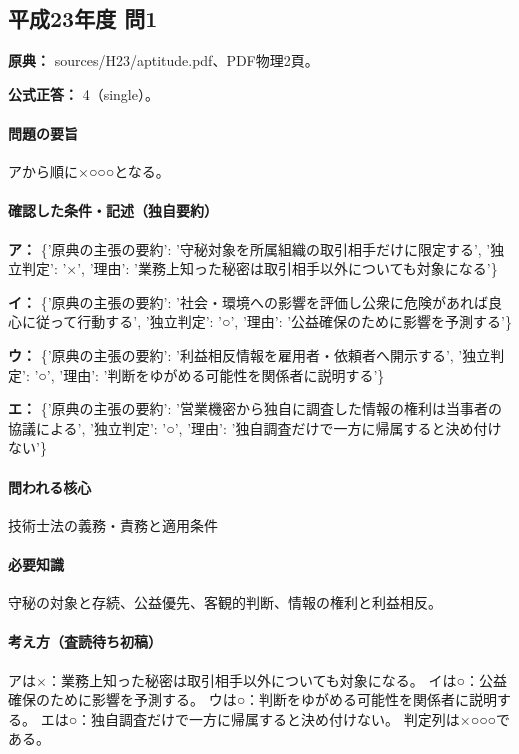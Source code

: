 \subsection{平成23年度 問1}
\label{q:h23-reg-apt-01}

\noindent\textbf{原典：} sources/H23/aptitude.pdf、PDF物理2頁。

\textbf{公式正答：} 4（single）。

\paragraph{問題の要旨} アから順に×○○○となる。

\paragraph{確認した条件・記述（独自要約）}\mbox{}\par

\noindent\textbf{ア：} \{'原典の主張の要約': '守秘対象を所属組織の取引相手だけに限定する', '独立判定': '×', '理由': '業務上知った秘密は取引相手以外についても対象になる'\}\par

\noindent\textbf{イ：} \{'原典の主張の要約': '社会・環境への影響を評価し公衆に危険があれば良心に従って行動する', '独立判定': '○', '理由': '公益確保のために影響を予測する'\}\par

\noindent\textbf{ウ：} \{'原典の主張の要約': '利益相反情報を雇用者・依頼者へ開示する', '独立判定': '○', '理由': '判断をゆがめる可能性を関係者に説明する'\}\par

\noindent\textbf{エ：} \{'原典の主張の要約': '営業機密から独自に調査した情報の権利は当事者の協議による', '独立判定': '○', '理由': '独自調査だけで一方に帰属すると決め付けない'\}\par

\paragraph{問われる核心} 技術士法の義務・責務と適用条件

\paragraph{必要知識} 守秘の対象と存続、公益優先、客観的判断、情報の権利と利益相反。

\paragraph{考え方（査読待ち初稿）} アは×：業務上知った秘密は取引相手以外についても対象になる。 イは○：公益確保のために影響を予測する。 ウは○：判断をゆがめる可能性を関係者に説明する。 エは○：独自調査だけで一方に帰属すると決め付けない。 判定列は×○○○である。

